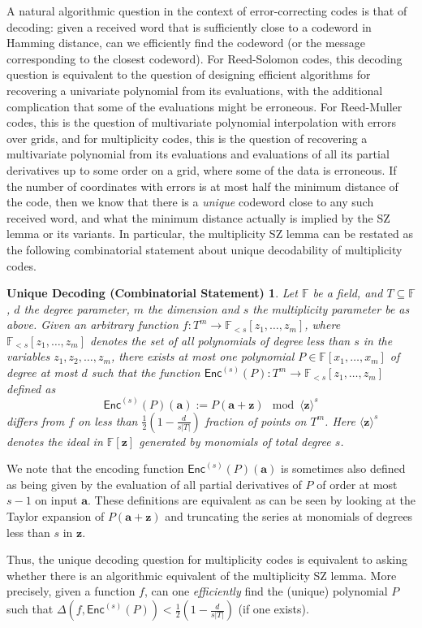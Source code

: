 \documentclass{article}
\def\Field{\mathbb{F}}
\let\F\Field
\def\veca{\mathbf{a}}
\def\vecz{\mathbf{z}}
\newtheorem*{combSZ}{Unique Decoding (Combinatorial Statement)}
\newcommand{\enc}{{\mathsf{Enc}}}
\newcommand{\vz}{\vecz}
\newcommand{\va}{\veca}
\begin{document}
	A natural algorithmic question in the context of error-correcting codes is that of decoding: given a received word that is sufficiently close to a codeword in Hamming distance, can we efficiently find the codeword (or the message corresponding to the closest codeword). For Reed-Solomon codes, this decoding question is equivalent to the question of designing efficient algorithms for recovering a univariate polynomial from its evaluations, with the additional complication that some of the evaluations might be erroneous. For Reed-Muller codes, this is the question of multivariate polynomial interpolation with errors over grids, and for multiplicity codes, this is the question of recovering a multivariate polynomial from its evaluations and evaluations of all its partial derivatives up to some order on  a grid, where some of the data is erroneous.  If the number of coordinates with errors is at most half the minimum distance of the code, then we know that there is a \emph{unique} codeword close to any such received word, and what the minimum distance actually is implied by the SZ lemma or its variants. In particular, the multiplicity SZ lemma can be restated as the following combinatorial statement about unique decodability of multiplicity codes. 
	\begin{combSZ}\label{thm:question}
		Let $\F$ be a field, and $T \subseteq \F$, $d$ the degree parameter,
		$m$ the dimension and $s$ the multiplicity parameter be as
		above. Given an arbitrary function
		$f\colon T^{m} \to \F_{<s}[z_1,\ldots,z_m]$, where $\F_{<s}[z_1,\ldots,z_m]$ denotes the set of all polynomials of degree less than $s$ in the variables $z_1,z_2,\ldots,z_m$, there exists \emph{at most
			one} polynomial $P \in \F[x_1, \ldots, x_m]$ of degree at most $d$
		such that the function $\enc^{(s)}(P)\colon T^{m} \to \F_{<s}[z_1,\ldots,z_m]$
		defined as
		\[
		\enc^{(s)}(P)(\va) := P(\va + \vz) \mod \langle \vz
		\rangle^s 
		\]
		differs from $f$ on less than $\frac12\left(1-\frac{d}{s|T|}\right)$ fraction of points on $T^m$. 
		Here $\langle \vz \rangle^s $ denotes the ideal in $\F[\vz]$ generated by monomials of total degree $s$.
	\end{combSZ}
	\begin{remark}
		We note that the encoding function $\enc^{(s)}(P)(\va)$ is sometimes also  defined as being given by the evaluation of all partial derivatives of $P$ of order at most $s-1$ on input $\va$. These definitions are equivalent as can be seen by looking at the Taylor expansion of $P(\va + \vz)$ and truncating the series at monomials of degrees less than $s$ in $\vz$.  
	\end{remark}
	Thus, the unique decoding question for multiplicity codes is equivalent to asking whether there is an algorithmic equivalent of the multiplicity SZ lemma. More precisely, given a function $f$, can one \emph{efficiently} find the (unique)
	polynomial $P$ such that
	$\Delta(f,\enc^{(s)}(P)) <\frac12\left(1-\frac{d}{s|T|}\right)$ (if one
	exists). 
	
\end{document}
